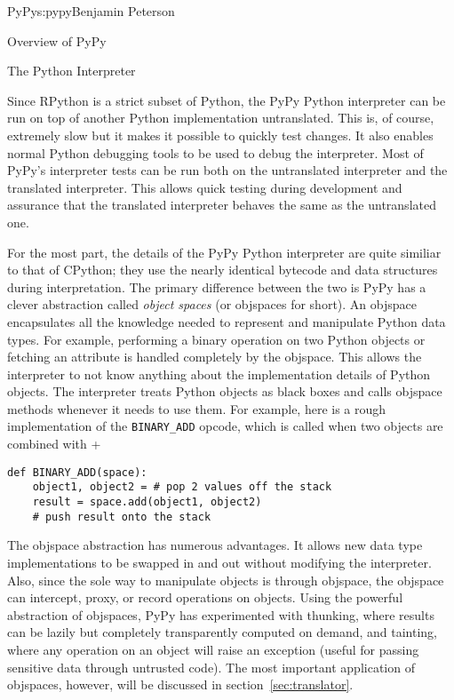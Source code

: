 \begin{aosachapter}{PyPy}{s:pypy}{Benjamin Peterson}
\begin{aosasect1}{Overview of PyPy}
\end{aosasect1}

\begin{aosasect1}{The Python Interpreter}

Since RPython is a strict subset of Python, the PyPy Python interpreter can be
run on top of another Python implementation untranslated. This is, of course,
extremely slow but it makes it possible to quickly test changes. It also enables
normal Python debugging tools to be used to debug the interpreter. Most of
PyPy's interpreter tests can be run both on the untranslated interpreter and the
translated interpreter. This allows quick testing during development and
assurance that the translated interpreter behaves the same as the untranslated
one.

For the most part, the details of the PyPy Python interpreter are quite similiar
to that of CPython; they use the nearly identical bytecode and data structures
during interpretation. The primary difference between the two is PyPy has a
clever abstraction called \emph{object spaces} (or objspaces for short). An
objspace encapsulates all the knowledge needed to represent and manipulate
Python data types. For example, performing a binary operation on two Python
objects or fetching an attribute is handled completely by the objspace. This
allows the interpreter to not know anything about the implementation details of
Python objects. The interpreter treats Python objects as black boxes and calls
objspace methods whenever it needs to use them. For example, here is a rough
implementation of the \verb+BINARY_ADD+ opcode, which is called when two
objects are combined with +

\begin{verbatim}
def BINARY_ADD(space):
    object1, object2 = # pop 2 values off the stack
    result = space.add(object1, object2)
    # push result onto the stack
\end{verbatim}

The objspace abstraction has numerous advantages. It allows new data type
implementations to be swapped in and out without modifying the
interpreter. Also, since the sole way to manipulate objects is through objspace,
the objspace can intercept, proxy, or record operations on objects. Using the
powerful abstraction of objspaces, PyPy has experimented with thunking, where
results can be lazily but completely transparently computed on demand, and
tainting, where any operation on an object will raise an exception (useful for
passing sensitive data through untrusted code). The most important application
of objspaces, however, will be discussed in section~\ref{sec:translator}.


\end{aosasect1}
\end{aosachapter}
